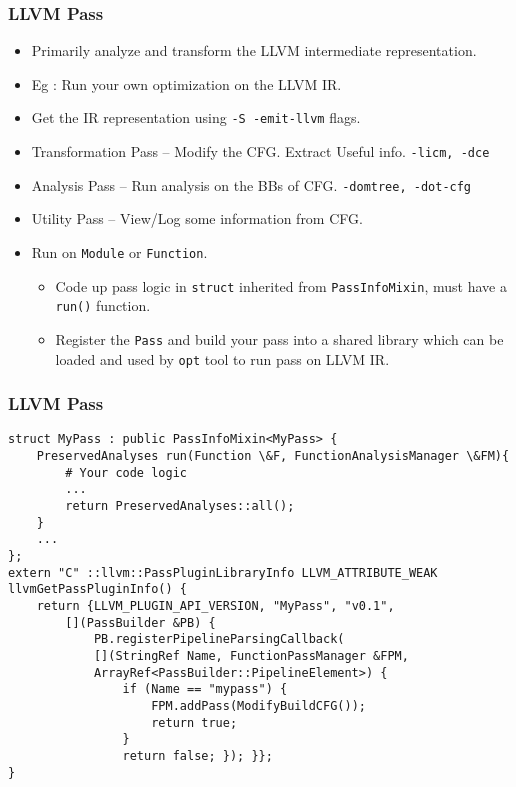 \documentclass{beamer}
\begin{document}
\begin{frame}
	\frametitle{LLVM Pass}
	\begin{itemize}
		\item Primarily analyze and transform the LLVM intermediate representation. \pause
		\item Eg : Run your own optimization on the LLVM IR. \pause
		\item Get the IR representation using \texttt{-S -emit-llvm} flags. \pause
		\item Transformation Pass -- Modify the CFG. Extract Useful info. \texttt{-licm, -dce}\pause
		\item Analysis Pass -- Run analysis on the BBs of CFG. \texttt{-domtree, -dot-cfg}\pause 
		\item Utility Pass -- View/Log some information from CFG. \pause
		\item Run on \texttt{Module} \pause or \texttt{Function}. \pause
		\begin{itemize}
			\item Code up pass logic in \texttt{struct} inherited from \texttt{PassInfoMixin}, \pause must have a \texttt{run()} function. \pause
			\item Register the \texttt{Pass} and build your pass into a shared library which can be loaded and used by \texttt{opt} tool to run pass on LLVM IR. 
		\end{itemize}
	\end{itemize}
\end{frame}

\begin{frame}[fragile]
	\frametitle{LLVM Pass}
	\begin{verbatim}
struct MyPass : public PassInfoMixin<MyPass> {
	PreservedAnalyses run(Function \&F, FunctionAnalysisManager \&FM){
		# Your code logic	
		...
		return PreservedAnalyses::all();
	}
	...
};
extern "C" ::llvm::PassPluginLibraryInfo LLVM_ATTRIBUTE_WEAK
llvmGetPassPluginInfo() {
	return {LLVM_PLUGIN_API_VERSION, "MyPass", "v0.1",
		[](PassBuilder &PB) {
			PB.registerPipelineParsingCallback(
			[](StringRef Name, FunctionPassManager &FPM,
			ArrayRef<PassBuilder::PipelineElement>) {
				if (Name == "mypass") {
					FPM.addPass(ModifyBuildCFG());
					return true;
				}
				return false; }); }};
}
	\end{verbatim}
\end{frame}
\end{document}
